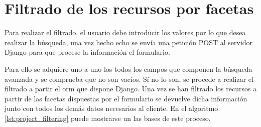 \section{Filtrado de los recursos por facetas}

Para realizar el filtrado, el usuario debe introducir los valores por lo que desea realizar la búsqueda, una vez hecho echo se envía una petición POST al servidor Django para que procese la información el formulario.

Para ello se adquiere uno a uno los todos los campos que componen la búsqueda avanzada y se comprueba que no son vacíos. Sí no lo son, se procede a realizar el filtrado a partir el \acrshort{orm} que dispone Django. Una vez se han filtrado los recursos a partir de las facetas dispuestas por el formulario se devuelve dicha información junto con todos los demás datos necesarios al cliente. En el algoritmo \ref{lst:project_filtering} puede mostrarse un las bases de este proceso.

